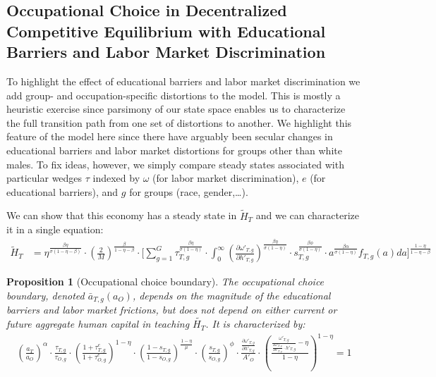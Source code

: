 \documentclass[onehalfspacing,11pt]{article}
\newtheorem{prp}{Proposition}
\begin{document}
\subsection{Occupational Choice in Decentralized Competitive Equilibrium with Educational Barriers and Labor Market Discrimination}
To highlight the effect of educational barriers and labor market discrimination we add group- and occupation-specific distortions to the model. This is mostly a heuristic exercise since parsimony of our state space enables us to characterize the full transition path from one set of distortions to another. We highlight this feature of the model here since there have arguably been secular changes in educational barriers and labor market distortions for groups other than white males. To fix ideas, however, we simply compare steady states associated with particular wedges $\tau$ indexed by $\omega$ (for labor market discrimination), $e$ (for educational barriers), and $g$ for groups (race, gender,\ldots).

We can show that this economy has a steady state in $\widetilde{H}_T$ and we can characterize it in a single equation:%
\begin{align}
\widetilde{H}_{T} & = \eta^{\frac{\beta\eta}{\sigma(1-\eta-\beta)}} \cdot \left(\tfrac{2}{M}\right)^{\frac{\beta}{1-\eta-\beta}} \cdot \Bigg[ \sum_{g=1}^G \tau_{T,g}^\frac{\beta\eta}{\sigma(1-\eta)} \cdot \int_0^\infty \left( \tfrac{\partial \omega'_{T,g}}{\partial h'_{T,g}} \right)^\frac{\beta\eta}{\sigma(1-\eta)} \cdot s_{T,g}^\frac{\beta\phi}{\sigma(1-\eta)} \cdot a^\frac{\beta\alpha}{\sigma(1-\eta)}  f_{T,g}(a)da \Bigg]^\frac{1-\eta}{1-\eta-\beta}
\end{align}
\begin{prp}[Occupational choice boundary] The occupational choice boundary, denoted $\bar{a}_{T,g}(a_O)$, depends on the magnitude of the educational barriers and labor market frictions, but does not depend on either current or future aggregate human capital in teaching $\widetilde{H_T}$. It is characterized by:%
%
\begin{align}
\label{eq:occChoice}
\left(\frac{a_T}{a_O}\right)^\alpha \cdot \frac{\tau_{T,g}}{\tau_{O,g}} \cdot \left(\frac{1+\tau^e_{T,g}}{1+\tau^e_{O,g}}\right)^{1-\eta}  \cdot \left(\frac{1-s_{T,g}}{1-s_{O,g}}\right)^\frac{1-\eta}{\mu} \cdot \left(\frac{s_{T,g}}{s_{O,g}}\right)^\phi \cdot \frac{\frac{\partial \omega'_{T,g}}{\partial h'_{T,g}}}{A'_O} \cdot \left(\frac{ \frac{\omega'_{T,g}}{\frac{\partial \omega'_{T,g}}{\partial h'_{T,g}} \cdot h'_{T,g}}-\eta}{1-\eta}\right)^{1-\eta}=1
\end{align}
\end{prp}
\end{document}
